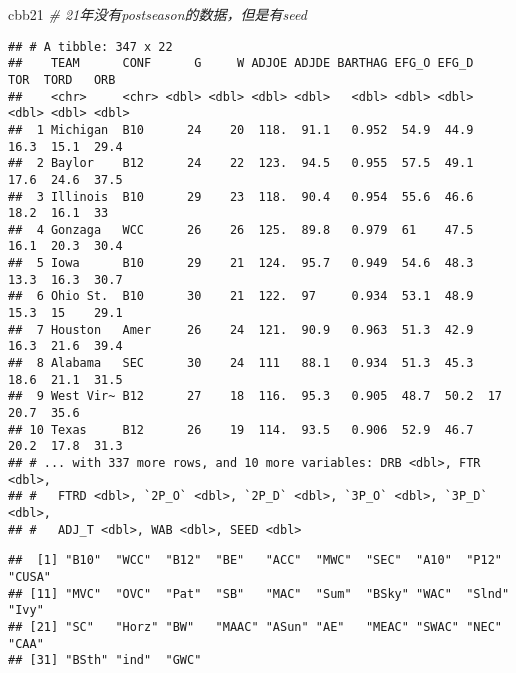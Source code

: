 \documentclass[
]{article}
\newenvironment{Shaded}{\begin{snugshade}}{\end{snugshade}}
\newcommand{\CommentTok}[1]{\textcolor[rgb]{0.56,0.35,0.01}{\textit{#1}}}
\newcommand{\FunctionTok}[1]{\textcolor[rgb]{0.00,0.00,0.00}{#1}}
\newcommand{\NormalTok}[1]{#1}
\newcommand{\SpecialCharTok}[1]{\textcolor[rgb]{0.00,0.00,0.00}{#1}}
\begin{document}
\begin{Shaded}
\begin{Highlighting}[]
\NormalTok{cbb21 }\CommentTok{\# 21年没有postseason的数据，但是有seed}
\end{Highlighting}
\end{Shaded}

\begin{verbatim}
## # A tibble: 347 x 22
##    TEAM      CONF      G     W ADJOE ADJDE BARTHAG EFG_O EFG_D   TOR  TORD   ORB
##    <chr>     <chr> <dbl> <dbl> <dbl> <dbl>   <dbl> <dbl> <dbl> <dbl> <dbl> <dbl>
##  1 Michigan  B10      24    20  118.  91.1   0.952  54.9  44.9  16.3  15.1  29.4
##  2 Baylor    B12      24    22  123.  94.5   0.955  57.5  49.1  17.6  24.6  37.5
##  3 Illinois  B10      29    23  118.  90.4   0.954  55.6  46.6  18.2  16.1  33  
##  4 Gonzaga   WCC      26    26  125.  89.8   0.979  61    47.5  16.1  20.3  30.4
##  5 Iowa      B10      29    21  124.  95.7   0.949  54.6  48.3  13.3  16.3  30.7
##  6 Ohio St.  B10      30    21  122.  97     0.934  53.1  48.9  15.3  15    29.1
##  7 Houston   Amer     26    24  121.  90.9   0.963  51.3  42.9  16.3  21.6  39.4
##  8 Alabama   SEC      30    24  111   88.1   0.934  51.3  45.3  18.6  21.1  31.5
##  9 West Vir~ B12      27    18  116.  95.3   0.905  48.7  50.2  17    20.7  35.6
## 10 Texas     B12      26    19  114.  93.5   0.906  52.9  46.7  20.2  17.8  31.3
## # ... with 337 more rows, and 10 more variables: DRB <dbl>, FTR <dbl>,
## #   FTRD <dbl>, `2P_O` <dbl>, `2P_D` <dbl>, `3P_O` <dbl>, `3P_D` <dbl>,
## #   ADJ_T <dbl>, WAB <dbl>, SEED <dbl>
\end{verbatim}

\begin{Shaded}
\end{Shaded}

\begin{verbatim}
##  [1] "B10"  "WCC"  "B12"  "BE"   "ACC"  "MWC"  "SEC"  "A10"  "P12"  "CUSA"
## [11] "MVC"  "OVC"  "Pat"  "SB"   "MAC"  "Sum"  "BSky" "WAC"  "Slnd" "Ivy" 
## [21] "SC"   "Horz" "BW"   "MAAC" "ASun" "AE"   "MEAC" "SWAC" "NEC"  "CAA" 
## [31] "BSth" "ind"  "GWC"
\end{verbatim}

\begin{Shaded}
\end{Shaded}
\end{document}
